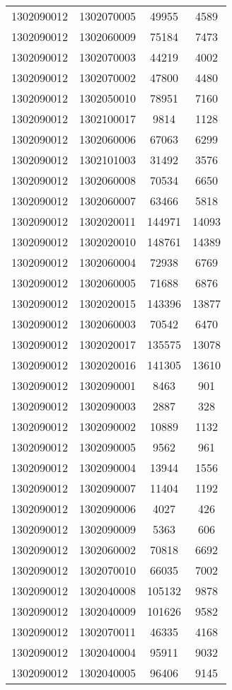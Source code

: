 \begin{longtable}{llcc}
1302090012 & 1302070005 & 49955 & 4589\\
1302090012 & 1302060009 & 75184 & 7473\\
1302090012 & 1302070003 & 44219 & 4002\\
1302090012 & 1302070002 & 47800 & 4480\\
1302090012 & 1302050010 & 78951 & 7160\\
1302090012 & 1302100017 & 9814 & 1128\\
1302090012 & 1302060006 & 67063 & 6299\\
1302090012 & 1302101003 & 31492 & 3576\\
1302090012 & 1302060008 & 70534 & 6650\\
1302090012 & 1302060007 & 63466 & 5818\\
1302090012 & 1302020011 & 144971 & 14093\\
1302090012 & 1302020010 & 148761 & 14389\\
1302090012 & 1302060004 & 72938 & 6769\\
1302090012 & 1302060005 & 71688 & 6876\\
1302090012 & 1302020015 & 143396 & 13877\\
1302090012 & 1302060003 & 70542 & 6470\\
1302090012 & 1302020017 & 135575 & 13078\\
1302090012 & 1302020016 & 141305 & 13610\\
1302090012 & 1302090001 & 8463 & 901\\
1302090012 & 1302090003 & 2887 & 328\\
1302090012 & 1302090002 & 10889 & 1132\\
1302090012 & 1302090005 & 9562 & 961\\
1302090012 & 1302090004 & 13944 & 1556\\
1302090012 & 1302090007 & 11404 & 1192\\
1302090012 & 1302090006 & 4027 & 426\\
1302090012 & 1302090009 & 5363 & 606\\
1302090012 & 1302060002 & 70818 & 6692\\
1302090012 & 1302070010 & 66035 & 7002\\
1302090012 & 1302040008 & 105132 & 9878\\
1302090012 & 1302040009 & 101626 & 9582\\
1302090012 & 1302070011 & 46335 & 4168\\
1302090012 & 1302040004 & 95911 & 9032\\
1302090012 & 1302040005 & 96406 & 9145\\

\end{longtable}
